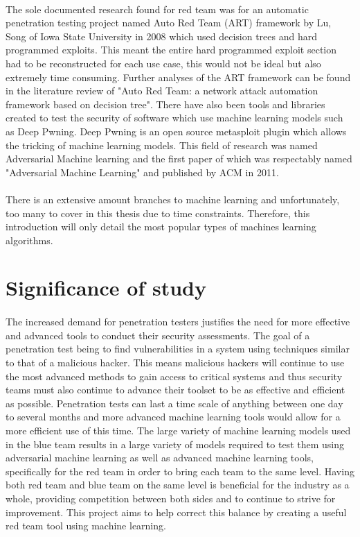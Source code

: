 \paragraph{}The sole documented research found for red team was for an automatic penetration testing project named Auto Red Team (ART) framework by Lu, Song of Iowa State University in 2008 which used decision trees and hard programmed exploits. This meant the entire hard programmed exploit section had to be reconstructed for each use case, this would not be ideal but also extremely time consuming. Further analyses of the ART framework can be found in the literature review of "Auto Red Team: a network attack automation framework based on decision tree". There have also been tools and libraries created to test the security of software which use machine learning models such as Deep Pwning. Deep Pwning is an open source metasploit plugin which allows the tricking of machine learning models. This field of research was named Adversarial Machine learning and the first paper of which was respectably named "Adversarial Machine Learning" and published by ACM in 2011.
\paragraph{}There is an extensive amount branches to machine learning and unfortunately, too many to cover in this thesis due to time constraints. Therefore, this introduction will only detail the most popular types of machines learning algorithms.


\section{Significance of study}
\label{sec:section3}


\paragraph{}The increased demand for penetration testers justifies the need for more effective and advanced tools to conduct their security assessments. The goal of a penetration test being to find vulnerabilities in a system using techniques similar to that of a malicious hacker. This means malicious hackers will continue to use the most advanced methods to gain access to critical systems and thus security teams must also continue to advance their toolset to be as effective and efficient as possible. Penetration tests can last a time scale of anything between one day to several months and more advanced machine learning tools would allow for a more efficient use of this time. The large variety of machine learning models used in the blue team results in a large variety of models required to test them using adversarial machine learning as well as advanced machine learning tools, specifically for the red team in order to bring each team to the same level. Having both red team and blue team on the same level is beneficial for the industry as a whole, providing competition between both sides and to continue to strive for improvement. This project aims to help correct this balance by creating a useful red team tool using machine learning.


